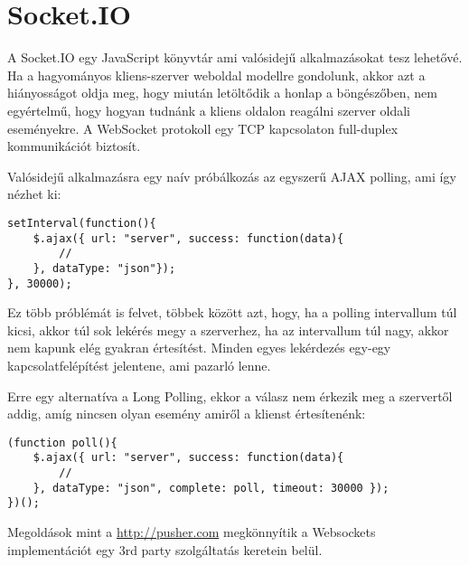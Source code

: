 \section{Socket.IO}
A Socket.IO egy JavaScript könyvtár ami valósidejű alkalmazásokat tesz lehetővé. Ha a hagyományos kliens-szerver weboldal modellre gondolunk, akkor azt a hiányosságot oldja meg, hogy miután letöltődik a honlap a böngészőben, nem egyértelmű, hogy hogyan tudnánk a kliens oldalon reagálni szerver oldali eseményekre. A WebSocket protokoll egy TCP kapcsolaton full-duplex kommunikációt biztosít.

Valósidejű alkalmazásra egy naív próbálkozás az egyszerű AJAX polling, ami így nézhet ki:
\medskip
\begin{lstlisting}[caption=Egyszerű polling]
setInterval(function(){
    $.ajax({ url: "server", success: function(data){
        //
    }, dataType: "json"});
}, 30000);
\end{lstlisting}

Ez több próblémát is felvet, többek között azt, hogy, ha a polling intervallum túl kicsi, akkor túl sok lekérés megy a szerverhez, ha az intervallum túl nagy, akkor nem kapunk elég gyakran értesítést. Minden egyes lekérdezés egy-egy kapcsolatfelépítést jelentene, ami pazarló lenne.

Erre egy alternatíva a Long Polling, ekkor a válasz nem érkezik meg a szervertől addig, amíg nincsen olyan esemény amiről a klienst értesítenénk:

\begin{lstlisting}[caption=Long Polling]
(function poll(){
    $.ajax({ url: "server", success: function(data){
        // 
    }, dataType: "json", complete: poll, timeout: 30000 });
})();
\end{lstlisting}


Megoldások mint a \url{http://pusher.com} megkönnyítik a Websockets implementációt egy 3rd party szolgáltatás keretein belül.